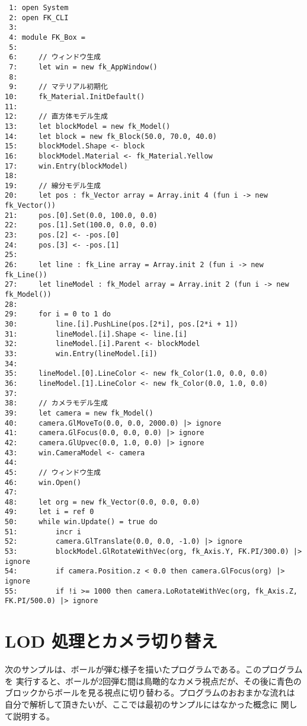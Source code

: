 \begin{breakbox}
\begin{verbatim}
 1: open System
 2: open FK_CLI
 3: 
 4: module FK_Box =
 5: 
 6:     // ウィンドウ生成
 7:     let win = new fk_AppWindow()
 8: 
 9:     // マテリアル初期化
10:     fk_Material.InitDefault()
11: 
12:     // 直方体モデル生成
13:     let blockModel = new fk_Model()
14:     let block = new fk_Block(50.0, 70.0, 40.0)
15:     blockModel.Shape <- block
16:     blockModel.Material <- fk_Material.Yellow
17:     win.Entry(blockModel)
18: 
19:     // 線分モデル生成
20:     let pos : fk_Vector array = Array.init 4 (fun i -> new fk_Vector())
21:     pos.[0].Set(0.0, 100.0, 0.0)
22:     pos.[1].Set(100.0, 0.0, 0.0)
23:     pos.[2] <- -pos.[0]
24:     pos.[3] <- -pos.[1]
25: 
26:     let line : fk_Line array = Array.init 2 (fun i -> new fk_Line())
27:     let lineModel : fk_Model array = Array.init 2 (fun i -> new fk_Model())
28: 
29:     for i = 0 to 1 do
30:         line.[i].PushLine(pos.[2*i], pos.[2*i + 1])
31:         lineModel.[i].Shape <- line.[i]
32:         lineModel.[i].Parent <- blockModel
33:         win.Entry(lineModel.[i])
34: 
35:     lineModel.[0].LineColor <- new fk_Color(1.0, 0.0, 0.0)
36:     lineModel.[1].LineColor <- new fk_Color(0.0, 1.0, 0.0)
37: 
38:     // カメラモデル生成
39:     let camera = new fk_Model()
40:     camera.GlMoveTo(0.0, 0.0, 2000.0) |> ignore
41:     camera.GlFocus(0.0, 0.0, 0.0) |> ignore
42:     camera.GlUpvec(0.0, 1.0, 0.0) |> ignore
43:     win.CameraModel <- camera
44: 
45:     // ウィンドウ生成
46:     win.Open()
47: 
48:     let org = new fk_Vector(0.0, 0.0, 0.0)
49:     let i = ref 0
50:     while win.Update() = true do
51:         incr i
52:         camera.GlTranslate(0.0, 0.0, -1.0) |> ignore
53:         blockModel.GlRotateWithVec(org, fk_Axis.Y, FK.PI/300.0) |> ignore
54:         if camera.Position.z < 0.0 then camera.GlFocus(org) |> ignore
55:         if !i >= 1000 then camera.LoRotateWithVec(org, fk_Axis.Z, FK.PI/500.0) |> ignore
\end{verbatim}
\end{breakbox}

\section{LOD 処理とカメラ切り替え}
次のサンプルは、ボールが弾む様子を描いたプログラムである。このプログラムを
実行すると、ボールが2回弾む間は鳥瞰的なカメラ視点だが、その後に青色の
ブロックからボールを見る視点に切り替わる。プログラムのおおまかな流れは
自分で解析して頂きたいが、ここでは最初のサンプルにはなかった概念に
関して説明する。

